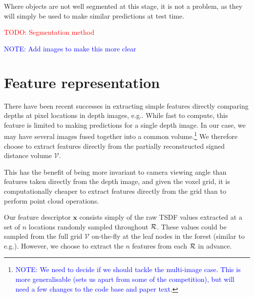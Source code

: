 \documentclass[10pt,twocolumn,letterpaper]{article}
\makeatletter
\renewcommand*{\eg}{e.g.\@\xspace}
\newcommand{\voxelgrid}{\mathcal{V}}
\newcommand{\todo}[1]{\textcolor{red}{TODO: #1}}
\newcommand{\note}[1]{\textcolor{blue}{NOTE: #1}}
\makeatother
\begin{document}
Where objects are not well segmented at this stage, it is not a problem, as they will simply be used to make similar predictions at test time.

\todo{Segmentation method}

\note{Add images to make this more clear}

\section{Feature representation}
\label{sec:features}

\newcommand{\scalfeat}{x}

There have been recent successes in extracting simple features directly comparing depths at pixel locations in depth images, \eg \cite{shotton-cvpr-2011}.
While fast to compute, this feature is limited to making predictions for a single depth image.
In our case, we may have several images fused together into a common volume.\footnote{\note{We need to decide if we should tackle the multi-image case. This is more generalisable (sets us apart from some of the competition), but will need a few changes to the code base and paper text.}}
We therefore choose to extract features directly from the partially reconstructed signed distance volume $\voxelgrid$.

This has the benefit of being more invariant to camera viewing angle than features taken directly from the depth image, and given the voxel grid, it is computationally cheaper to extract features directly from the grid than to perform point cloud operations.

Our feature descriptor $\mathbf{x}$ consists simply of the raw TSDF values extracted at a set of $n$ locations randomly sampled throughout $\mathcal{R}$.
These values could be sampled from the full grid $\voxelgrid$ on-the-fly at the leaf nodes in the forest (similar to \eg \cite{shotton-cvpr-2011}).
However, we choose to extract the $n$ features from each $\mathcal{R}$ in advance.




\end{document}
